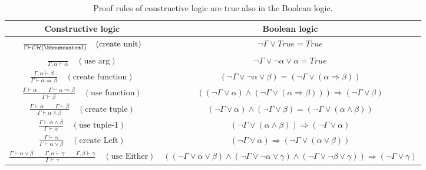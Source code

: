 \begin{table}
\begin{centering}
\begin{tabular}{|c|c|}
\hline 
\textbf{Constructive logic} & \textbf{Boolean logic}\tabularnewline
\hline 
\hline 
{\small{}$\frac{}{\Gamma\vdash{\cal CH}(\bbnum 1)}\quad(\text{create unit})$} & {\small{}$\neg\Gamma\vee True=True$}\tabularnewline
\hline 
{\small{}$\frac{~}{\Gamma,\alpha\vdash\alpha}\quad(\text{use arg})$} & {\small{}$\neg\Gamma\vee\neg\alpha\vee\alpha=True$}\tabularnewline
\hline 
{\small{}$\frac{\Gamma,\alpha\vdash\beta}{\Gamma\vdash\alpha\Rightarrow\beta}\quad(\text{create function})$} & {\small{}$\left(\neg\Gamma\vee\neg\alpha\vee\beta\right)=\left(\neg\Gamma\vee\left(\alpha\Rightarrow\beta\right)\right)$}\tabularnewline
\hline 
{\small{}$\frac{\Gamma\vdash\alpha\quad\quad\Gamma\vdash\alpha\Rightarrow\beta}{\Gamma\vdash\beta}\quad(\text{use function})$} & {\small{}$\left(\left(\neg\Gamma\vee\alpha\right)\wedge\left(\neg\Gamma\vee\left(\alpha\Rightarrow\beta\right)\right)\right)\Rightarrow\left(\neg\Gamma\vee\beta\right)$}\tabularnewline
\hline 
{\small{}$\frac{\Gamma\vdash\alpha\quad\quad\Gamma\vdash\beta}{\Gamma\vdash\alpha\wedge\beta}\quad(\text{create tuple})$} & {\small{}$\left(\neg\Gamma\vee\alpha\right)\wedge\left(\neg\Gamma\vee\beta\right)=\left(\neg\Gamma\vee\left(\alpha\wedge\beta\right)\right)$}\tabularnewline
\hline 
{\small{}$\frac{\Gamma\vdash\alpha\wedge\beta}{\Gamma\vdash\alpha}\quad(\text{use tuple-}1)$} & {\small{}$\left(\neg\Gamma\vee\left(\alpha\wedge\beta\right)\right)\Rightarrow\left(\neg\Gamma\vee\alpha\right)$}\tabularnewline
\hline 
{\small{}$\frac{\Gamma\vdash\alpha}{\Gamma\vdash\alpha\vee\beta}\quad(\text{create Left})$} & {\small{}$\left(\neg\Gamma\vee\alpha\right)\Rightarrow\left(\neg\Gamma\vee\left(\alpha\vee\beta\right)\right)$}\tabularnewline
\hline 
{\small{}$\frac{\Gamma\vdash\alpha\vee\beta\quad\quad\Gamma,\alpha\vdash\gamma\quad\quad\Gamma,\beta\vdash\gamma}{\Gamma\vdash\gamma}\quad(\text{use Either})$} & {\small{}$\left(\left(\neg\Gamma\vee\alpha\vee\beta\right)\wedge\left(\neg\Gamma\vee\neg\alpha\vee\gamma\right)\wedge\left(\neg\Gamma\vee\neg\beta\vee\gamma\right)\right)\Rightarrow\left(\neg\Gamma\vee\gamma\right)$}\tabularnewline
\hline 
\end{tabular}
\par\end{centering}
\caption{Proof rules of constructive logic are true also in the Boolean logic.\label{tab:Proof-rules-of-constructive-and-boolean}}
\end{table}

